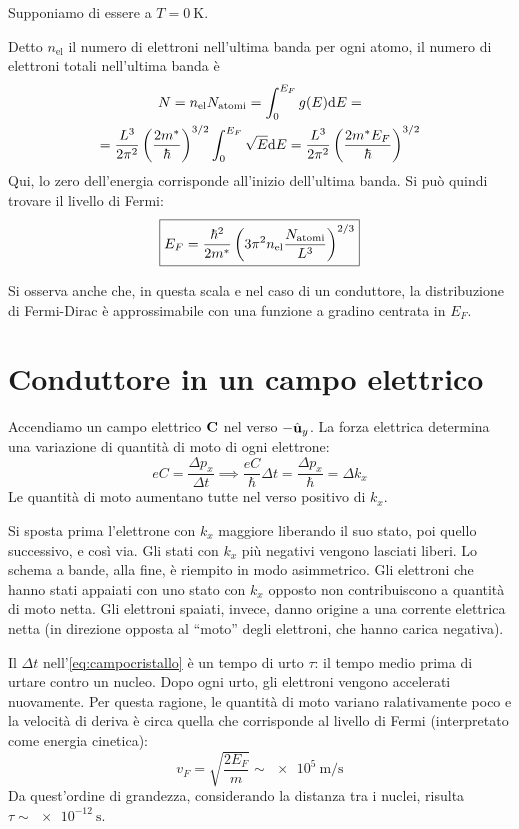 Supponiamo di essere a $T = \qty{0}{\kelvin}$.

Detto $n_\text{el}$ il numero di elettroni nell'ultima banda per ogni atomo, il numero di elettroni totali nell'ultima banda è
\begin{gather}
    N = n_\text{el} N_\text{atomi} = \int_0^{E_F} g(E) \mathrm{d} E = \\
    = \frac{L^3}{2 \pi^2} \left( \frac{2 m^*}{\hbar} \right)^{3/2} \int_0^{E_F} \sqrt{E} \mathrm{d} E
    = \frac{L^3}{2 \pi^2} \left( \frac{2 m^* E_F}{\hbar} \right)^{3/2}
\end{gather}
Qui, lo zero dell'energia corrisponde all'inizio dell'ultima banda.
Si può quindi trovare il livello di Fermi:
\begin{equation}
    \boxed{
    E_F = \frac{\hbar^2}{2 m^*} \left( 3 \pi^2 n_\text{el} \frac{N_\text{atomi}}{L^3} \right)^{2/3}
    }
\end{equation}


Si osserva anche che, in questa scala e nel caso di un conduttore, la distribuzione di Fermi-Dirac è approssimabile con una funzione a gradino centrata in $E_F$.

\section{Conduttore in un campo elettrico}

Accendiamo un campo elettrico $\mathbf{C}$ nel verso $-\hat{\mathbf{u}}_{y}$.
La forza elettrica determina una variazione di quantità di moto di ogni elettrone:
\begin{equation}
\label{eq:campocristallo}
    e C = \frac{\Delta p_x}{\Delta t}
    \implies
    \frac{e C}{\hbar} \Delta t = \frac{\Delta p_x}{\hbar} = \Delta k_x
\end{equation}
Le quantità di moto aumentano tutte nel verso positivo di $k_x$.

Si sposta prima l'elettrone con $k_x$ maggiore liberando il suo stato, poi quello successivo, e così via.
Gli stati con $k_x$ più negativi vengono lasciati liberi.
Lo schema a bande, alla fine, è riempito in modo asimmetrico.
Gli elettroni che hanno stati appaiati con uno stato con $k_x$ opposto non contribuiscono a quantità di moto netta.
Gli elettroni spaiati, invece, danno origine a una corrente elettrica netta (in direzione opposta al ``moto'' degli elettroni, che hanno carica negativa).

Il $\Delta t$ nell'\cref{eq:campocristallo} è un tempo di urto $\tau$: il tempo medio prima di urtare contro un nucleo.
Dopo ogni urto, gli elettroni vengono accelerati nuovamente.
Per questa ragione, le quantità di moto variano ralativamente poco e la velocità di deriva è circa quella che corrisponde al livello di Fermi (interpretato come energia cinetica):
\begin{equation}
    v_F = \sqrt{\frac{2 E_F}{m}} \sim \qty{e5}{\metre\per\second}
\end{equation}
Da quest'ordine di grandezza, considerando la distanza tra i nuclei, risulta $\tau \sim \qty{e-12}{\second}$.

